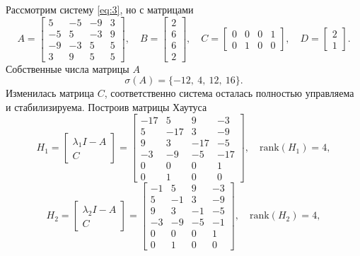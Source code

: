 Рассмотрим систему \ref{eq:3}, но с матрицами
\begin{equation*}
    A=\begin{bmatrix}
        5& -5& -9& 3\\
        -5& 5& -3& 9\\
        -9& -3& 5& 5\\
        3& 9& 5& 5
    \end{bmatrix},\quad
    B=\begin{bmatrix}
        2\\
        6\\
        6\\
        2
    \end{bmatrix},\quad
    C=\begin{bmatrix}
        0& 0& 0& 1\\
        0& 1& 0& 0
    \end{bmatrix},\quad
    D=\begin{bmatrix}
        2\\1
    \end{bmatrix}.
\end{equation*}
Собственные числа матрицы $A$
\begin{equation*}
    \sigma(A)=\{-12,\ 4,\ 12,\ 16\}.
\end{equation*}
Изменилась матрица $C$, соответственно
система осталась полностью управляема и стабилизируема. Построив матрицы
Хаутуса
\begin{equation*}
H_1 = \begin{bmatrix}
    \lambda_1 I - A \\ C
    \end{bmatrix} =
\begin{bmatrix}
    -17 & 5 & 9 & -3 \\
    5 & -17 & 3 & -9 \\
    9 & 3 & -17 & -5 \\
    -3 & -9 & -5 & -17 \\
    0 & 0 & 0 & 1 \\
    0 & 1 & 0 & 0
\end{bmatrix},\quad
\text{rank}(H_1) = 4,
\end{equation*}
\begin{equation*}
H_2 = \begin{bmatrix}
    \lambda_2 I - A \\ C
    \end{bmatrix} =
\begin{bmatrix}
    -1 & 5 & 9 & -3 \\
    5 & -1 & 3 & -9 \\
    9 & 3 & -1 & -5 \\
    -3 & -9 & -5 & -1 \\
    0 & 0 & 0 & 1 \\
    0 & 1 & 0 & 0
\end{bmatrix},\quad
\text{rank}(H_2) = 4,
\end{equation*}
